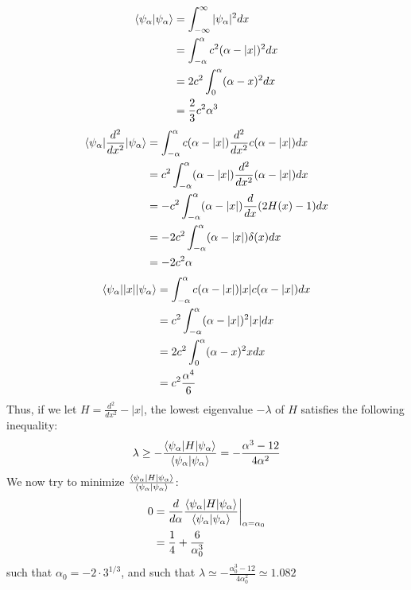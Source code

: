 \documentclass[12pt, letterpaper]{article}
\begin{document}
\begin{enumerate}
    \begin{align}
            \braket{\psi_\alpha|\psi_\alpha}&=\int_{-\infty}^\infty|\psi_\alpha|^2dx\\
            &=\int_{-\alpha}^\alpha c^2(\alpha-|x|)^2dx\\
            &=2c^2\int_0^\alpha(\alpha-x)^2dx\\
            &=\frac{2}{3}c^2\alpha^3
    \end{align}
    \begin{align}
            \braket{\psi_\alpha|\frac{d^2}{dx^2}|\psi_\alpha}&=\int_{-\alpha}^\alpha c(\alpha-|x|)\frac{d^2}{dx^2}c(\alpha-|x|)dx\\
            &=c^2\int_{-\alpha}^\alpha(\alpha-|x|)\frac{d^2}{dx^2}(\alpha-|x|)dx\\
            &=-c^2\int_{-\alpha}^\alpha(\alpha-|x|)\frac{d}{dx}(2H(x)-1)dx\\
            &=-2c^2\int_{-\alpha}^\alpha(\alpha-|x|)\delta(x)dx\\
            &=-2c^2\alpha
    \end{align}
    \begin{align}
            \braket{\psi_\alpha||x||\psi_\alpha}&=\int_{-\alpha}^\alpha c(\alpha-|x|)|x|c(\alpha-|x|)dx\\
            &=c^2\int_{-\alpha}^\alpha(\alpha-|x|)^2|x|dx\\
            &=2c^2\int_{0}^\alpha(\alpha-x)^2xdx\\
            &=c^2\frac{\alpha^4}{6}
    \end{align}
    Thus, if we let $H=\frac{d^2}{dx^2}-|x|$, the lowest eigenvalue $-\lambda$ of $H$ satisfies the following inequality:
    \begin{equation}
            \lambda\geq-\frac{\braket{\psi_\alpha|H|\psi_\alpha}}{\braket{\psi_\alpha|\psi_\alpha}}=-\frac{\alpha^3-12}{4\alpha^2}
    \end{equation}
    We now try to minimize $\frac{\braket{\psi_\alpha|H|\psi_\alpha}}{\braket{\psi_\alpha|\psi_\alpha}}$:
    \begin{align}
            0&=\frac{d}{d\alpha}\frac{\braket{\psi_\alpha|H|\psi_\alpha}}{\braket{\psi_\alpha|\psi_\alpha}}\biggr\rvert_{\alpha=\alpha_0}\\
            &=\frac{1}{4}+\frac{6}{\alpha_0^3}
    \end{align}
    such that $\alpha_0=-2\cdot3^{1/3}$, and such that $\lambda\simeq-\frac{\alpha_0^3-12}{4\alpha_0^2}\simeq1.082$
    

    
    
\end{enumerate}
\end{document}
